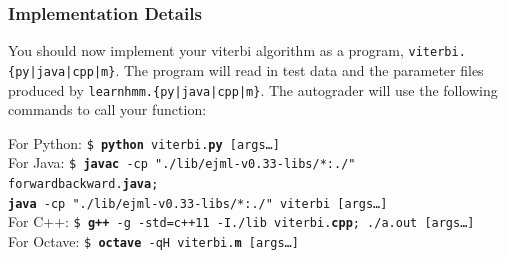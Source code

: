 \documentclass{article}
\begin{document}
\subsubsection{Implementation Details}

You should now implement your viterbi algorithm as a program, \texttt{viterbi.\{py|java|cpp|m\}}. The program will read in test data and the parameter files produced by \texttt{learnhmm.\{py|java|cpp|m\}}. The autograder will use the following commands to call your function:

\begin{tabbing}
For Python: \=\texttt{\$ \textbf{python} viterbi.\textbf{py} [args\dots]}\\
For Java: \>\texttt{\$ \textbf{javac} -cp "./lib/ejml-v0.33-libs/*:./" forwardbackward.\textbf{java};}\\ \>  \texttt{\textbf{java} -cp "./lib/ejml-v0.33-libs/*:./" viterbi [args\dots]}\\
For C++: \>\texttt{\$ \textbf{g++} -g -std=c++11 -I./lib viterbi.\textbf{cpp}; ./a.out [args\dots]}\\
For Octave: \>\texttt{\$ \textbf{octave} -qH viterbi.\textbf{m} [args\dots]}
\end{tabbing}
\end{document}
